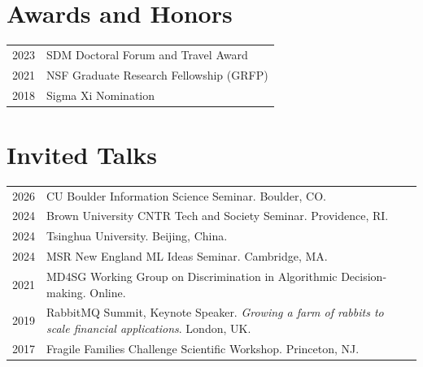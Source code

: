 \documentclass[margin]{res}
\begin{document}
\begin{resume}
\section{Awards and Honors}
\begin{tabular}{l l}
2023& SDM Doctoral Forum and Travel Award\\	
2021& NSF Graduate Research Fellowship (GRFP)\\
2018& Sigma Xi Nomination
\end{tabular}

\section{Invited Talks}
\begin{tabular}{l p{\dimexpr\linewidth-24pt-4\tabcolsep\relax}}
2026& CU Boulder Information Science Seminar. Boulder, CO.\\
2024& Brown University CNTR Tech and Society Seminar. Providence, RI.\\
2024& Tsinghua University. Beijing, China.\\
2024& MSR New England ML Ideas Seminar. Cambridge, MA.\\	
2021& MD4SG Working Group on Discrimination in Algorithmic Decision-making. Online.\\
2019& RabbitMQ Summit, Keynote Speaker. \textit{Growing a farm of rabbits to scale financial applications}. London, UK.\\
2017& Fragile Families Challenge Scientific Workshop. Princeton, NJ.\\
\end{tabular}



\end{resume} 
\end{document}
